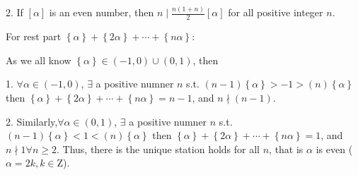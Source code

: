 \documentclass{Math_Note}
\begin{document}
\begin{sol}
2. If $\left[\alpha\right]$ is an even number, then $n\mid\frac{n\left(1+n\right)}{2}\left[\alpha\right]$ for all positive integer $n$.

For rest part $\left\{\alpha\right\}+\left\{2\alpha\right\}+\cdots+\left\{n\alpha\right\}$:

As we all know $\left\{\alpha\right\}\in\left(-1,0\right)\cup\left(0,1\right)$, then 

1. $\forall\alpha\in\left(-1,0\right)$, $\exists$ a positive numner $n$ s.t. $\left(n-1\right)\left\{\alpha\right\}>-1>\left(n\right)\left\{\alpha\right\}$ 
then $\left\{\alpha\right\}+\left\{2\alpha\right\}+\cdots+\left\{n\alpha\right\}=n-1$, and $n\nmid\left(n-1\right)$.

2. Similarly,$\forall\alpha\in\left(0,1\right)$, $\exists$ a positive numner $n$ s.t. $\left(n-1\right)\left\{\alpha\right\}<1<\left(n\right)\left\{\alpha\right\}$
then $\left\{\alpha\right\}+\left\{2\alpha\right\}+\cdots+\left\{n\alpha\right\}=1$, and $n\nmid 1 \forall n\geq2$.
\newline\newline
\marginpar{\textcolor{green}{conclusion}}
Thus, there is the unique station holds for all $n$, that is $\alpha$ is even ($\alpha=2k, k\in\mathrm{Z}$).
\end{sol}

\end{document}
